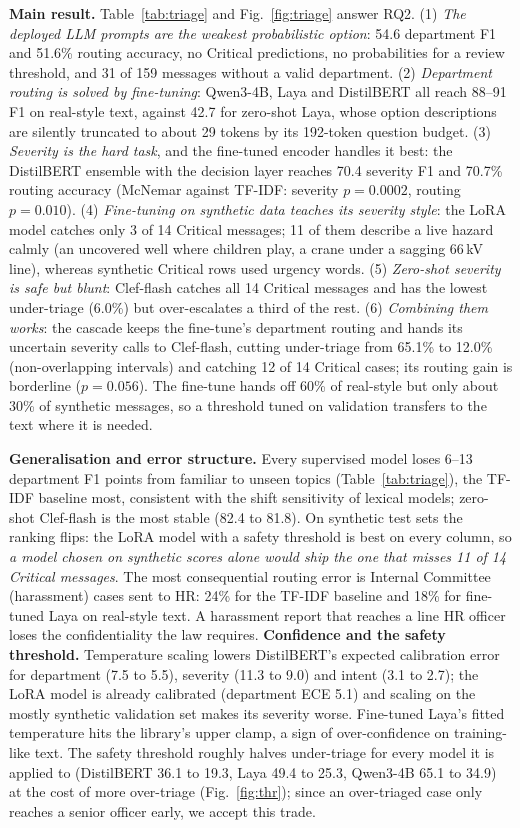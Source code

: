 \documentclass[conference]{IEEEtran}
\begin{document}
\textbf{Main result.} Table~\ref{tab:triage} and Fig.~\ref{fig:triage} answer RQ2. (1) \emph{The deployed LLM
prompts are the weakest probabilistic option}: 54.6 department F1 and 51.6\% routing accuracy, no Critical
predictions, no probabilities for a review threshold, and 31 of 159 messages without a valid department. (2)
\emph{Department routing is solved by fine-tuning}: Qwen3-4B, Laya and DistilBERT all reach 88--91 F1 on real-style
text, against 42.7 for zero-shot Laya, whose option descriptions are silently truncated to about 29 tokens by its
192-token question budget. (3) \emph{Severity is the hard task}, and the fine-tuned encoder handles it best: the
DistilBERT ensemble with the decision layer reaches 70.4 severity F1 and 70.7\% routing accuracy (McNemar against
TF-IDF: severity $p{=}0.0002$, routing $p{=}0.010$). (4) \emph{Fine-tuning on synthetic data teaches its severity
style}: the LoRA model catches only 3 of 14 Critical messages; 11 of them describe a live hazard calmly (an
uncovered well where children play, a crane under a sagging 66\,kV line), whereas synthetic Critical rows used
urgency words. (5) \emph{Zero-shot severity is safe but blunt}: Clef-flash catches all 14 Critical messages and has
the lowest under-triage (6.0\%) but over-escalates a third of the rest. (6) \emph{Combining them works}: the cascade
keeps the fine-tune's department routing and hands its uncertain severity calls to Clef-flash, cutting under-triage
from 65.1\% to 12.0\% (non-overlapping intervals) and catching 12 of 14 Critical cases; its routing gain is
borderline ($p{=}0.056$). The fine-tune hands off 60\% of real-style but only about 30\% of synthetic messages, so a
threshold tuned on validation transfers to the text where it is needed.

\textbf{Generalisation and error structure.} Every supervised model loses 6--13 department F1 points from familiar
to unseen topics (Table~\ref{tab:triage}), the TF-IDF baseline most, consistent with the shift sensitivity of
lexical models; zero-shot Clef-flash is the most stable (82.4 to 81.8). On synthetic test
sets the ranking flips: the LoRA model with a safety threshold is best on every column, so \emph{a model chosen on
synthetic scores alone would ship the one that misses 11 of 14 Critical messages}. The most consequential routing
error is Internal Committee (harassment) cases sent to HR: 24\% for the TF-IDF baseline and 18\% for fine-tuned
Laya on real-style text. A harassment report that reaches a line HR officer loses the confidentiality the law
requires.
\textbf{Confidence and the safety threshold.} Temperature scaling lowers DistilBERT's expected calibration error
for department (7.5 to 5.5), severity (11.3 to 9.0) and intent (3.1 to 2.7); the LoRA model is already calibrated
(department ECE 5.1) and scaling on the mostly synthetic validation set makes its severity worse. Fine-tuned Laya's
fitted temperature hits the library's upper clamp, a sign of over-confidence on training-like text. The safety
threshold roughly halves under-triage for every model it is applied to (DistilBERT 36.1 to 19.3, Laya 49.4 to 25.3,
Qwen3-4B 65.1 to 34.9) at the cost of more over-triage (Fig.~\ref{fig:thr}); since an over-triaged case only
reaches a senior officer early, we accept this trade.
\end{document}

